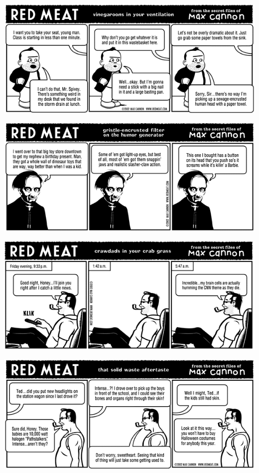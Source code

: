 \documentclass[a4paper,twoside,11pt]{article}
\begin{document}
\includegraphics[width=\textwidth]{redmeat_2002-09-03.png}



\includegraphics[width=\textwidth]{redmeat_2002-09-10.png}



\includegraphics[width=\textwidth]{redmeat_2002-09-17.png}



\includegraphics[width=\textwidth]{redmeat_2002-09-24.png}
\end{document}
